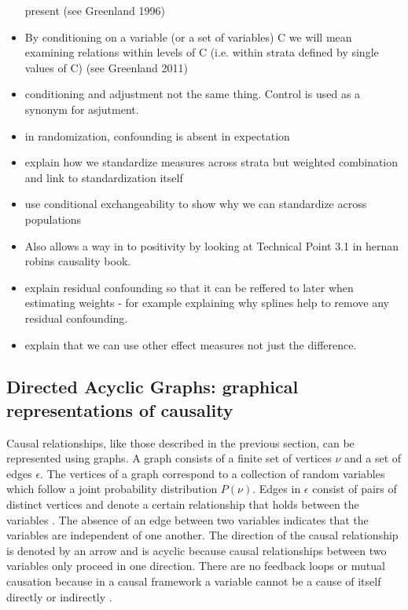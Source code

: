 \documentclass[11pt]{article}
\begin{document}
\begin{itemize}
  present (see Greenland 1996)
\item
  By conditioning on a variable (or a set of variables) C we will mean
  examining relations within levels of C (i.e. within strata defined by
  single values of C) (see Greenland 2011)
\item
  conditioning and adjustment not the same thing. Control is used as a
  synonym for asjutment.
\item
  in randomization, confounding is absent in expectation
\item
  explain how we standardize measures across strata but weighted
  combination and link to standardization itself
\item
  use conditional exchangeability to show why we can standardize across
  populations
\item
  Also allows a way in to positivity by looking at Technical Point 3.1
  in hernan robins causality book.
\item
  explain residual confounding so that it can be reffered to later when
  estimating weights - for example explaining why splines help to remove
  any residual confounding.
\item
  explain that we can use other effect measures not just the difference.
\end{itemize}

    \subsection{Directed Acyclic Graphs: graphical representations of
causality}\label{directed-acyclic-graphs-graphical-representations-of-causality}

Causal relationships, like those described in the previous section, can
be represented using graphs. A graph consists of a finite set of
vertices \(\nu\) and a set of edges \(\epsilon\). The vertices of a
graph correspond to a collection of random variables which follow a
joint probability distribution \(P(\nu)\). Edges in \(\epsilon\) consist
of pairs of distinct vertices and denote a certain relationship that
holds between the variables \citet{Pearl2009}. The absence of an edge
between two variables indicates that the variables are independent of
one another. The direction of the causal relationship is denoted by an
arrow and is acyclic because causal relationships between two variables
only proceed in one direction. There are no feedback loops or mutual
causation because in a causal framework a variable cannot be a cause of
itself directly or indirectly \citet{Hernan2004}.\linebreak
\end{document}
